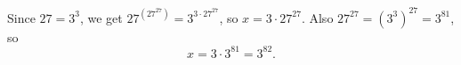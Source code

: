 Since $27=3^3$, we get $27^{\left(27^{27}\right)}=3^{3\cdot27^{27}}$, so $x=3\cdot27^{27}$. Also $27^{27}=\left(3^3\right)^{27}=3^{81}$, so
\[x=3\cdot3^{81}=\boxed{3^{82}}.\]
